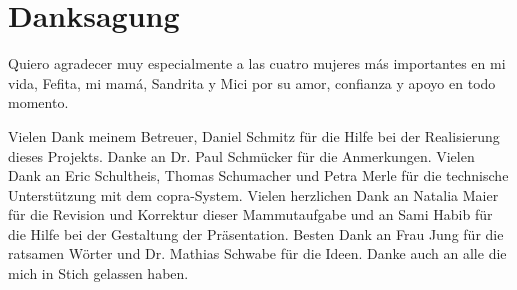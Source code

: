 \chapter*{Danksagung}

Quiero agradecer muy especialmente a las cuatro mujeres m\'as importantes en mi vida, Fefita, mi mam\'a, Sandrita y Mici por su amor, confianza y apoyo en todo momento.

Vielen Dank meinem Betreuer, Daniel Schmitz für die Hilfe bei der Realisierung dieses Projekts. Danke an Dr. Paul Schmücker für die Anmerkungen. Vielen Dank an Eric Schultheis, Thomas Schumacher und Petra Merle für die technische Unterstützung mit dem \acs{copra}-System. Vielen herzlichen Dank an Natalia Maier für die Revision und Korrektur dieser Mammutaufgabe und an Sami Habib für die Hilfe bei der Gestaltung der Präsentation. Besten Dank an Frau Jung für die ratsamen Wörter und Dr. Mathias Schwabe für die Ideen. Danke auch an alle die mich in Stich gelassen haben.
